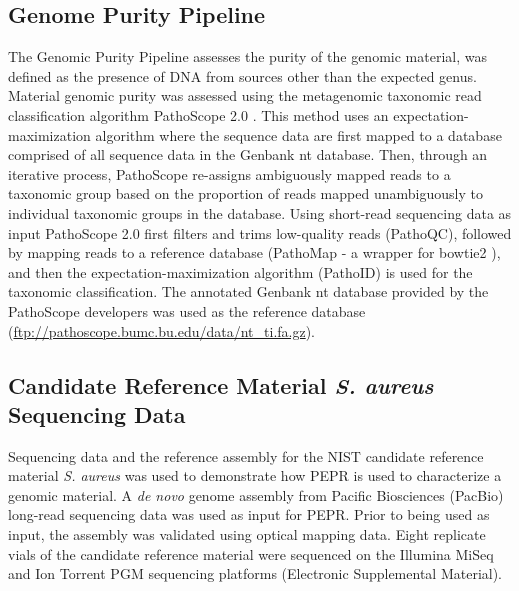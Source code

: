 \documentclass[smallextended]{svjour3}\usepackage[]{graphicx}\usepackage[]{color}
\begin{document}
\subsection{Genome Purity Pipeline}
\label{method:4}
The Genomic Purity Pipeline assesses the purity of the genomic material, was defined as the presence of DNA from sources other than the expected genus. 
Material genomic purity was assessed using the metagenomic taxonomic read classification algorithm PathoScope 2.0 \cite{Hong2014}. 
This method uses an expectation-maximization algorithm where the sequence data are first mapped to a database comprised of all sequence data in the Genbank nt database. 
Then, through an iterative process, PathoScope re-assigns ambiguously mapped reads to a taxonomic group based on the proportion of reads mapped unambiguously to individual taxonomic groups in the database. 
Using short-read sequencing data as input PathoScope 2.0 first filters and trims low-quality reads (PathoQC), followed by mapping reads to a reference database (PathoMap - a wrapper for bowtie2 \cite{Langmead2012}), and then the expectation-maximization algorithm (PathoID) is used for the taxonomic classification. 
The annotated Genbank nt database provided by the PathoScope developers was used as the reference database (\url{ftp://pathoscope.bumc.bu.edu/data/nt_ti.fa.gz}). 


\subsection{Candidate Reference Material \textit{S. aureus} Sequencing Data}
Sequencing data and the reference assembly for the NIST candidate reference material \textit{S. aureus} was used to demonstrate how PEPR is used to characterize a genomic material. 
A \textit{de novo} genome assembly from Pacific Biosciences (PacBio) long-read sequencing data was used as input for PEPR. 
Prior to being used as input, the assembly was validated using optical mapping data. 
Eight replicate vials of the candidate reference material were sequenced on the Illumina MiSeq and Ion Torrent PGM sequencing platforms (Electronic Supplemental Material).
\end{document}
